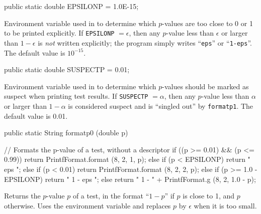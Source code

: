 \begin{code}

   public static double EPSILONP = 1.0E-15;
\end{code}
 \begin{tabb}  Environment variable used in  to determine
   which $p$-values are too close to 0 or 1 to be printed explicitly.
   If \texttt{EPSILONP} $= \epsilon$, then any $p$-value
   less than $\epsilon$ or larger than
   $1-\epsilon$ is {\em not\/} written explicitly;
   the program simply writes ``\texttt{eps}'' or ``\texttt{1-eps}''.
   The default value is $10^{-15}$.
 \end{tabb}
\begin{code}

   public static double SUSPECTP = 0.01;
\end{code}
 \begin{tabb}  Environment variable used in  to determine
   which $p$-values should be marked as suspect when printing test results.
   If \texttt{SUSPECTP} $= \alpha$, then any $p$-value
   less than $\alpha$ or larger than
   $1-\alpha$ is considered suspect and is
   ``singled out'' by \texttt{formatp1}.
   The default value is 0.01.
 \end{tabb}
\begin{code}

   public static String formatp0 (double p)\begin{hide} {
      // Formats the p-value of a test, without a descriptor
      if ((p >= 0.01) && (p <= 0.99))
         return PrintfFormat.format (8, 2, 1, p);
      else if (p < EPSILONP)
         return "   eps  ";
      else if (p < 0.01)
         return PrintfFormat.format (8, 2, 2, p);
      else if (p >= 1.0 - EPSILONP)
         return " 1 - eps ";
      else
         return " 1 - " + PrintfFormat.g (8, 2, 1.0 - p);
   }\end{hide}
\end{code}
\begin{tabb}  Returns the $p$-value $p$ of a test,
   in the format ``$1-p$'' if $p$ is close to 1, and $p$ otherwise.
   Uses the environment variable   and replaces $p$
   by $\epsilon$ when it is too small.
\end{tabb}
